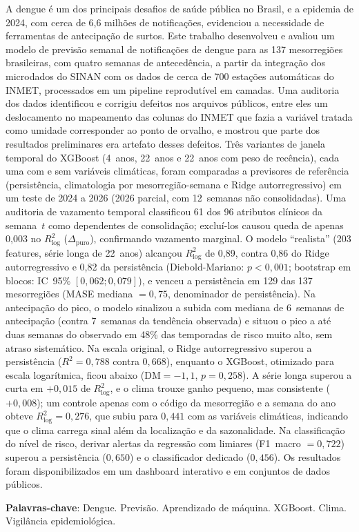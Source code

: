 \begin{resumo}
    A dengue é um dos principais desafios de saúde pública no Brasil, e a epidemia de 2024, com cerca de 6,6 milhões de notificações, evidenciou a necessidade de ferramentas de antecipação de surtos. Este trabalho desenvolveu e avaliou um modelo de previsão semanal de notificações de dengue para as 137 mesorregiões brasileiras, com quatro semanas de antecedência, a partir da integração dos microdados do SINAN com os dados de cerca de 700 estações automáticas do INMET, processados em um pipeline reprodutível em camadas. Uma auditoria dos dados identificou e corrigiu defeitos nos arquivos públicos, entre eles um deslocamento no mapeamento das colunas do INMET que fazia a variável tratada como umidade corresponder ao ponto de orvalho, e mostrou que parte dos resultados preliminares era artefato desses defeitos. Três variantes de janela temporal do XGBoost (4~anos, 22~anos e 22~anos com peso de recência), cada uma com e sem variáveis climáticas, foram comparadas a previsores de referência (persistência, climatologia por mesorregião-semana e Ridge autorregressivo) em um teste de 2024 a 2026 (2026 parcial, com 12~semanas não consolidadas). Uma auditoria de vazamento temporal classificou 61 dos 96 atributos clínicos da semana~$t$ como dependentes de consolidação; excluí-los causou queda de apenas 0,003 no $R^2_{\log}$ ($\Delta_{\mathrm{puro}}$), confirmando vazamento marginal. O modelo ``realista'' (203 features, série longa de 22~anos) alcançou $R^2_{\log}$ de 0,89, contra 0,86 do Ridge autorregressivo e 0,82 da persistência (Diebold-Mariano: $p < 0{,}001$; bootstrap em blocos: IC~95\% $[0{,}062; 0{,}079]$), e venceu a persistência em 129 das 137 mesorregiões (MASE mediana $= 0{,}75$, denominador de persistência). Na antecipação do pico, o modelo sinalizou a subida com mediana de 6~semanas de antecipação (contra 7~semanas da tendência observada) e situou o pico a até duas semanas do observado em 48\% das temporadas de risco muito alto, sem atraso sistemático. Na escala original, o Ridge autorregressivo superou a persistência ($R^2=0{,}788$ contra $0{,}668$), enquanto o XGBoost, otimizado para escala logarítmica, ficou abaixo ($\mathrm{DM}=-1{,}1$, $p=0{,}258$). A série longa superou a curta em $+0{,}015$ de $R^2_{\log}$, e o clima trouxe ganho pequeno, mas consistente ($+0{,}008$); um controle apenas com o código da mesorregião e a semana do ano obteve $R^2_{\log}=0{,}276$, que subiu para $0{,}441$ com as variáveis climáticas, indicando que o clima carrega sinal além da localização e da sazonalidade. Na classificação do nível de risco, derivar alertas da regressão com limiares (F1~macro $= 0{,}722$) superou a persistência ($0{,}650$) e o classificador dedicado ($0{,}456$). Os resultados foram disponibilizados em um dashboard interativo e em conjuntos de dados públicos.

     \vspace{\onelineskip}

     \noindent
     \textbf{Palavras-chave}: Dengue. Previsão. Aprendizado de máquina. XGBoost. Clima. Vigilância epidemiológica.
\end{resumo}
